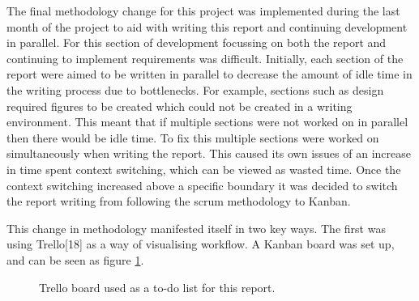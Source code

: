 \documentclass{article}
\begin{document}
The final methodology change for this project was implemented during the last month of the project to aid with writing this report and continuing development in parallel. For this section of development focussing on both the report and continuing to implement requirements was difficult. Initially, each section of the report were aimed to be written in parallel to decrease the amount of idle time in the writing process due to bottlenecks. For example, sections such as design required figures to be created which could not be created in a writing environment. This meant that if multiple sections were not worked on in parallel then there would be idle time. To fix this multiple sections were worked on simultaneously when writing the report. This caused its own issues of an increase in time spent context switching, which can be viewed as wasted time. Once the context switching increased above a specific boundary it was decided to switch the report writing from following the scrum methodology to Kanban. \par

This change in methodology manifested itself in two key ways. The first was using Trello[18] as a way of visualising workflow. A Kanban board was set up, and can be seen as figure \ref{figure:trelloBoardOG}. 

\begin{figure}[H]
	\centering
	\caption{Trello board used as a to-do list for this report.}
	\label{figure:trelloBoardOG}
\end{figure}
\end{document}
